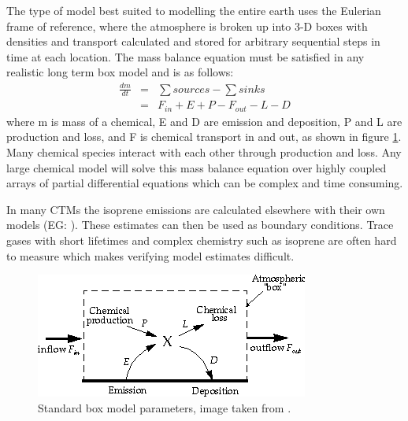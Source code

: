     The type of model best suited to modelling the entire earth uses the Eulerian frame of reference, where the atmosphere is broken up into 3-D boxes with densities and transport calculated and stored for arbitrary sequential steps in time at each location.
    The mass balance equation must be satisfied in any realistic long term box model and is as follows: 
    \begin{align*}
	\frac{dm}{dt} &=& \sum{sources}-\sum{sinks} \\
	&=& F_{in} + E + P - F_{out} - L - D 
    \end{align*}
    where m is mass of a chemical, E and D are emission and deposition, P and L are production and loss, and F is chemical transport in and out, as shown in figure \ref{ch_LitRev:fig:boxmodel}.
    Many chemical species interact with each other through production and loss. 
    Any large chemical model will solve this mass balance equation over highly coupled arrays of partial differential equations which can be complex and time consuming.

    In many CTMs the isoprene emissions are calculated elsewhere with their own models (EG: \citet{Guenther2006}).
    These estimates can then be used as boundary conditions.
    Trace gases with short lifetimes and complex chemistry such as isoprene are often hard to measure which makes verifying model estimates difficult.

    \begin{figure}
      \includegraphics{Figures/boxmodel.png}
      \caption{ Standard box model parameters, image taken from \citet{Jacob_1999_book}. }
      \label{ch_LitRev:fig:boxmodel}
    \end{figure}

